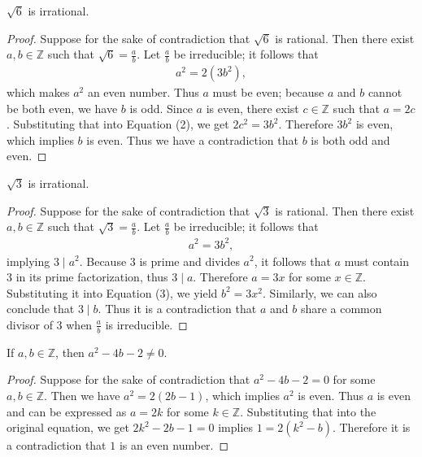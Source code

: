 \documentclass{exam}
\begin{document}
\begin{proposition}{6.4}
    $\sqrt6$ is irrational.
\end{proposition}

\begin{proof}
    Suppose for the sake of contradiction that $\sqrt6$ is rational. Then there exist $a,b\in\mathbb Z$ such that $\sqrt6=\frac a b$. Let $\frac a b$ be irreducible; it follows that
    \begin{align}
        a^2 = 2(3b^2),
    \end{align}
    which makes $a^2$ an even number. Thus $a$ must be even; because $a$ and $b$ cannot be both even, we have $b$ is odd. Since $a$ is even, there exist $c\in\mathbb Z$ such that $a = 2c$. Substituting that into Equation (2), we get $2c^2 = 3b^2$. Therefore $3b^2$ is even, which implies $b$ is even. Thus we have a contradiction that $b$ is both odd and even.
\end{proof}

\begin{proposition}{6.5}
    $\sqrt3$ is irrational.
\end{proposition}

\begin{proof}
    Suppose for the sake of contradiction that $\sqrt3$ is rational. Then there exist $a, b\in\mathbb Z$ such that $\sqrt3 = \frac a b$. Let $\frac a b$ be irreducible; it follows that 
    \begin{align}
    a^2 = 3b^2,
    \end{align}
    implying $3\mid a^2$. Because $3$ is prime and divides $a^2$, it follows that $a$ must contain $3$ in its prime factorization, thus $3 \mid a$. Therefore $a = 3x$ for some $x\in\mathbb Z$. Substituting it into Equation (3), we yield $b^2 = 3x^2$. Similarly, we can also conclude that $3\mid b$. Thus it is a contradiction that $a$ and $b$ share a common divisor of 3 when $\frac a b$ is irreducible.
\end{proof}

\begin{proposition}{6.6}
    If $a, b\in\mathbb Z$, then $a^2-4b-2\neq0$.
\end{proposition}

\begin{proof}
    Suppose for the sake of contradiction that $a^2-4b-2 = 0$ for some $a, b\in\mathbb Z$. Then we have $a^2=2(2b - 1)$, which implies $a^2$ is even. Thus $a$ is even and can be expressed as $a = 2k$ for some $k\in\mathbb Z$. Substituting that into the original equation, we get $2k^2 - 2b -1 = 0$ implies $1 = 2(k^2 - b)$. Therefore it is a contradiction that $1$ is an even number.
\end{proof}
\end{document}

